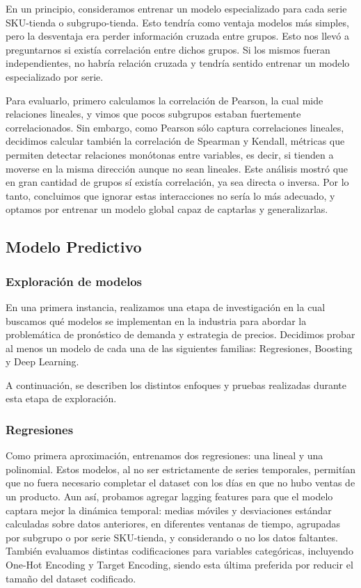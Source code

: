 \documentclass[12pt,a4paper]{article}
\begin{document}
En un principio, consideramos entrenar un modelo especializado para cada serie SKU-tienda o subgrupo-tienda. Esto tendría como ventaja modelos más simples, pero la desventaja era perder información cruzada entre grupos. Esto nos llevó a preguntarnos si existía correlación entre dichos grupos.  
Si los mismos fueran independientes, no habría relación cruzada y tendría sentido entrenar un modelo especializado por serie. 

Para evaluarlo, primero calculamos la correlación de Pearson, la cual mide relaciones lineales, y vimos que pocos subgrupos estaban fuertemente correlacionados.  
Sin embargo, como Pearson sólo captura correlaciones lineales, decidimos calcular también la correlación de Spearman y Kendall, métricas que permiten detectar relaciones monótonas entre variables, es decir, si tienden a moverse en la misma dirección aunque no sean lineales.  
Este análisis mostró que en gran cantidad de grupos sí existía correlación, ya sea directa o inversa. Por lo tanto, concluimos que ignorar estas interacciones no sería lo más adecuado, y optamos por entrenar un modelo global capaz de captarlas y generalizarlas.

\subsection{Modelo Predictivo}

    \subsubsection{Exploración de modelos}

    En una primera instancia, realizamos una etapa de investigación en la cual buscamos qué modelos se implementan en la industria para abordar la problemática de pronóstico de demanda y estrategia de precios. Decidimos probar al menos un 
    modelo de cada una de las siguientes familias: Regresiones, Boosting y Deep Learning.

    A continuación, se describen los distintos enfoques y pruebas realizadas durante esta etapa de exploración.

    \newpage

        \subsubsection{Regresiones}

        Como primera aproximación, entrenamos dos regresiones: una lineal y una polinomial. Estos modelos, al no ser estrictamente de series temporales, permitían que no fuera necesario completar el dataset con los días en que no hubo ventas 
        de un producto. Aun así, probamos agregar lagging features para que el modelo captara mejor la dinámica temporal: medias móviles y desviaciones estándar calculadas sobre datos anteriores, en diferentes ventanas de tiempo, agrupadas por subgrupo o por serie SKU-tienda, y considerando o no los datos faltantes.  
        También evaluamos distintas codificaciones para variables categóricas, incluyendo One-Hot Encoding y Target Encoding, siendo esta última preferida por reducir el tamaño del dataset codificado.
\end{document}
